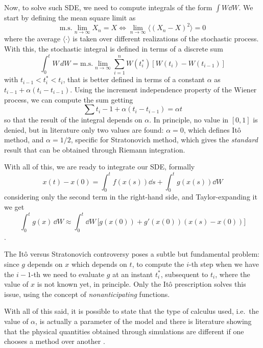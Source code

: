 \documentclass[../../master_thesis_np.tex]{subfiles}
\begin{document}
		Now, to solve such SDE, we need to compute integrals of the form $\int W \dd{W}$. We start by defining the mean square limit as
		\begin{equation} 
			\text{m.s.} \lim_{n \to \infty} X_n = X \iff \lim_{n \to \infty} \langle(X_n - X)^2\rangle = 0 
		\end{equation}
		where the average $\langle \cdot \rangle$ is taken over different realizations of the stochastic process. With this, the stochastic integral is defined in terms of a discrete sum
		\begin{equation} 
			\int_0^t W \, dW = \text{m.s.} \lim_{n \to \infty} \sum_{i=1}^n W(t_i^*) \left[ W(t_i) - W(t_{i-1}) \right] 
		\end{equation}
		with $t_{i-1} < t_i^* < t_i$, that is better defined in terms of a constant $\alpha$ as $t_{i-1}+\alpha (t_i - t_{i-1})$. Using the increment independence property of the Wiener process, we can compute the sum getting 
		\begin{equation} 
			\sum t_i-1 + \alpha(t_i - t_{i-1}) = \alpha t 
		\end{equation}
		so that the result of the integral depends on $\alpha$. In principle, no value in $[0,1]$ is denied, but in literature only two values are found: $\alpha = 0$, which defines Itô method, and $\alpha = 1/2$, specific for Stratonovich method, which gives the \emph{standard} result that can be obtained through Riemann integration. 
		
		With all of this, we are ready to integrate our SDE, formally
		\begin{equation} 
			x(t) - x(0) = \int_{0}^{t} f(x(s)) \dd{s} + \int_{0}^{t} g(x(s)) \dd{W}
		\end{equation} 
		considering only the second term in the right-hand side, and Taylor-expanding it we get
		\begin{equation} 
			\int_0^t g(x) \, \dd{W} \approx \int_0^t \dd{W} \, \big[g(x(0)) + g'(x(0))(x(s) - x(0))\big]
		 \end{equation}.
		 
		 The Itô versus Stratonovich controversy poses a subtle but fundamental problem: since $g$ depends on $x$ which depends on $t$, to compute the $i$-th step when we have the $i-1$-th we need to evaluate $g$ at an instant $t_i^*$, subsequent to $t_i$, where the value of $x$ is not known yet, in principle. Only the Itô prescription solves this issue, using the concept of \emph{nonanticipating} functions.
		 
		 With all of this said, it is possible to state that the type of calculus used, i.e.~the value of $\alpha$, is actually a parameter of the model and there is literature showing that the physical quantities obtained through simulations are different if one chooses a method over another \cite{mannella_ito_2012}.	
		
\end{document}
